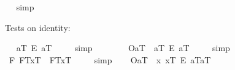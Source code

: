\begin{isabellebody}
\isadelimproof
\ %
\endisadelimproof
%
\isatagproof
{}\isamarkupfalse%
\ simp\ \isamarkupfalse%
\ %
%
\endisatagproof
{\isafoldproof}%
%
\isadelimproof
%
\endisadelimproof
%
\begin{isamarkuptext}%
Tests on identity:%
\end{isamarkuptext}%
\isamarkuptrue%
\ \isamarkupfalse%
\ {\isachardoublequoteopen}{\isacharbrackleft}a\isactrlsup T\ \isactrlbold {\isacharequal}\isactrlsub E\ a\isactrlsup T{\isacharbrackright}\ {\isacharequal}\ {\isasymtop}{\isachardoublequoteclose}%
\isadelimproof
\ %
\endisadelimproof
%
\isatagproof
{}\isamarkupfalse%
\ simp%
\endisatagproof
{\isafoldproof}%
%
\isadelimproof
%
\endisadelimproof
\ \isamarkupfalse%
%
\isadelimproof
\ %
\endisadelimproof
%
\isatagproof
{}\isamarkupfalse%
\ %
%
\endisatagproof
{\isafoldproof}%
%
\isadelimproof
%
\endisadelimproof
\isanewline
\ \isamarkupfalse%
\ {\isachardoublequoteopen}{\isacharbrackleft}{\isasymlparr}O{\isacharbang}{\isacharcomma}a\isactrlsup T{\isasymrparr}\ \isactrlbold {\isasymrightarrow}\ a\isactrlsup T\ \isactrlbold {\isacharequal}\isactrlsub E\ a\isactrlsup T{\isacharbrackright}\ {\isacharequal}\ {\isasymtop}{\isachardoublequoteclose}%
\isadelimproof
\ %
\endisadelimproof
%
\isatagproof
{}\isamarkupfalse%
\ simp\ \isamarkupfalse%
%
\endisatagproof
{\isafoldproof}%
%
\isadelimproof
%
\endisadelimproof
\isanewline
\isanewline
\ \isamarkupfalse%
\ {\isachardoublequoteopen}{\isacharbrackleft}{\isacharparenleft}\isactrlbold {\isasymforall}F{\isachardot}\ {\isasymlparr}F\isactrlsup T{\isacharcomma}x\isactrlsup T{\isasymrparr}\ \isactrlbold {\isasymequiv}\ {\isasymlparr}F\isactrlsup T{\isacharcomma}x\isactrlsup T{\isasymrparr}{\isacharparenright}{\isacharbrackright}\ {\isacharequal}\ {\isasymtop}{\isachardoublequoteclose}%
\isadelimproof
\ %
\endisadelimproof
%
\isatagproof
{}\isamarkupfalse%
\ simp\ \isamarkupfalse%
%
\endisatagproof
{\isafoldproof}%
%
\isadelimproof
%
\endisadelimproof
\isanewline
\ \isamarkupfalse%
\ {\isachardoublequoteopen}{\isacharbrackleft}{\isasymlparr}O{\isacharbang}{\isacharcomma}a\isactrlsup T{\isasymrparr}\ \isactrlbold {\isasymrightarrow}\ {\isasymlparr}\isactrlbold {\isasymlambda}x{\isachardot}\ x\isactrlsup T\ \isactrlbold {\isacharequal}\isactrlsub E\ a\isactrlsup T{\isacharcomma}a\isactrlsup T{\isasymrparr}{\isacharbrackright}\ {\isacharequal}\ {\isasymtop}{\isachardoublequoteclose}%

\end{isabellebody}
